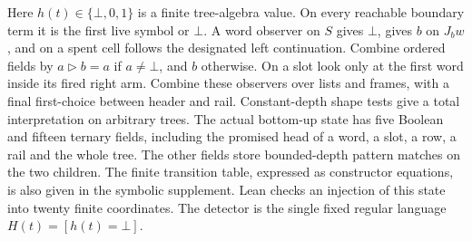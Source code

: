 Here \(h(t)\in\{\bot,0,1\}\) is a finite tree-algebra value. On every reachable boundary term it is the first live symbol or \(\bot\). A word observer on \(S\) gives \(\bot\), gives \(b\) on \(J_b w\), and on a spent cell follows the designated left continuation. Combine ordered fields by \(a\triangleright b=a\) if \(a\ne\bot\), and \(b\) otherwise. On a slot look only at the first word inside its fired right arm. Combine these observers over lists and frames, with a final first-choice between header and rail. Constant-depth shape tests give a total interpretation on arbitrary trees. The actual bottom-up state has five Boolean and fifteen ternary fields, including the promised head of a word, a slot, a row, a rail and the whole tree. The other fields store bounded-depth pattern matches on the two children. The finite transition table, expressed as constructor equations, is also given in the symbolic supplement. Lean checks an injection of this state into twenty finite coordinates. The detector is the single fixed regular language \(H(t)=[h(t)=\bot]\).

